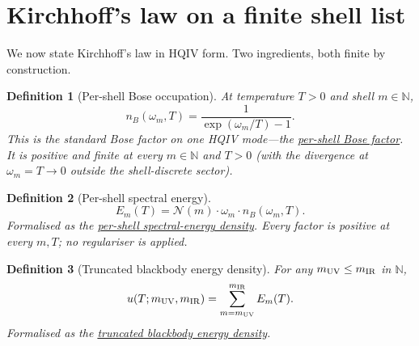 \documentclass[11pt]{amsart}
\newtheorem{definition}{Definition}[section]
\begin{document}
\section{Kirchhoff's law on a finite shell list}\label{sec:kirchhoff}

We now state Kirchhoff's law in HQIV form.  Two ingredients,
both finite by construction.

\begin{definition}[Per-shell Bose occupation]\label{def:bose}
At temperature $T>0$ and shell $m\in\mathbb{N}$,
\begin{equation}\label{eq:nbose}
  n_{B}(\omega_m,T)
   =\frac{1}{\exp(\omega_m/T)-1}.
\end{equation}
This is the standard Bose factor on \emph{one} HQIV mode---the
\hyperref[lean:bose]{per-shell Bose factor}. It is positive and
finite at every $m\in\mathbb{N}$ and $T>0$ (with the divergence at
$\omega_m=T\to 0$ outside the shell-discrete sector).
\end{definition}

\begin{definition}[Per-shell spectral energy]\label{def:spec}
\begin{equation}\label{eq:shellE}
  E_m(T)=\mathcal{N}(m)\cdot\omega_m\cdot n_{B}(\omega_m,T).
\end{equation}
Formalised as the
\hyperref[lean:shell-spectral]{per-shell spectral-energy density}.
Every factor is positive at every $m,T$; no regulariser is
applied.
\end{definition}

\begin{definition}[Truncated blackbody energy density]\label{def:bb}
For any $m_{\rm UV}\le m_{\rm IR}$ in $\mathbb{N}$,
\begin{equation}\label{eq:Edens}
  u(T;m_{\rm UV},m_{\rm IR})
   =\sum_{m=m_{\rm UV}}^{m_{\rm IR}} E_m(T).
\end{equation}
Formalised as the
\hyperref[lean:blackbody-density]{truncated blackbody energy
density}.
\end{definition}
\end{document}
